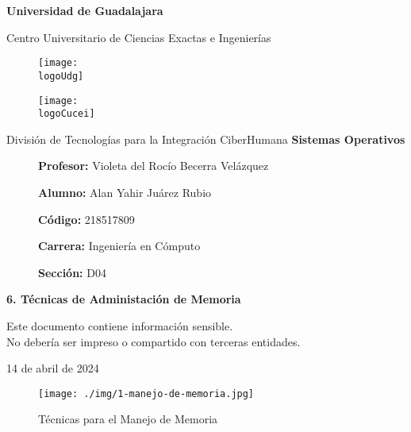 \documentclass[12pt, a4paper]{article} %
\title{\theTitle}
\author{\theAuthor}
\newcommand{\logoUdg}{../../../../attachments/images/portada-udg.jpeg}
\newcommand{\logoCucei}{../../../../attachments/images/portada-cucei.jpeg}
\newcommand{\materia}{Sistemas Operativos}
\newcommand{\theTitle}{6. Técnicas de Administación de Memoria}
\newcommand{\profesor}{Violeta del Rocío Becerra Velázquez}
\newcommand{\theAuthor}{Alan Yahir Juárez Rubio}
\newcommand{\code}{218517809}
\newcommand{\carrera}{Ingeniería en Cómputo}
\newcommand{\seccion}{D04}
\newcommand{\startDate}{14 de abril de 2024}
\newcommand{\nl}{\par\vspace{0.4cm}}
\begin{document}
\cfoot{\ifodd\value{page}\else\thepage\fi} %

\begin{titlepage}
	\centering
	{\huge\textbf{Universidad de Guadalajara}}\par\vspace{0.6cm}
	{\LARGE{Centro Universitario de Ciencias Exactas e Ingenierías}}\vfill
	
	\begin{figure}[h]
		\begin{minipage}[t]{0.45\textwidth}
			\centering
			\texttt{[image: \\logoUdg]}
		\end{minipage}
		\hfill
		\begin{minipage}[t]{0.45\textwidth}
			\centering
			\texttt{[image: \\logoCucei]}
		\end{minipage}
	\end{figure}\vfill
	
	{\Large{División de Tecnologías para la Integración CiberHumana}}\vfill
	{\Large\textbf{\materia}}\vfill
	\begin{figure}[h]
		\centering
		\begin{minipage}[t]{0.75\textwidth}
			{\Large
				\textbf{Profesor:} \profesor\nl
				\textbf{Alumno:} \theAuthor\nl
				\textbf{Código:} \code\nl
				\textbf{Carrera:} \carrera\nl
				\textbf{Sección:} \seccion
			}
		\end{minipage}
	\end{figure}\vfill
	{\LARGE{\textbf{\theTitle}}}\vfill
	
	\begin{tcolorbox}[colback=red!5!white, colframe=red!75!black]
		\centering
		Este documento contiene información sensible.\\
		No debería ser impreso o compartido con terceras entidades.
	\end{tcolorbox}\vfill
	{\large \startDate}\par
\end{titlepage}

\clearpage
\tableofcontents

\clearpage
\listoffigures
	

\clearpage

\begin{figure}[h]
	\centering
	\texttt{[image: ./img/1-manejo-de-memoria.jpg]}
	\caption{Técnicas para el Manejo de Memoria}
\end{figure}
\end{document}

